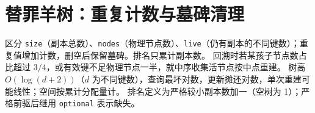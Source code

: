 \section{替罪羊树：重复计数与墓碑清理}\label{knowledge-scapegoat}
区分 \texttt{size}（副本总数）、\texttt{nodes}（物理节点数）、\texttt{live}（仍有副本的不同键数）；重复值增加计数，删空后保留墓碑。排名只累计副本数。
回溯时若某孩子节点数占比超过 $3/4$，或有效键不足物理节点一半，就中序收集活节点按中点重建。
树高 $O(\log(d+2))$（$d$ 为不同键数），查询最坏对数，更新摊还对数，单次重建可能线性；空间按累计分配量计。
排名定义为严格较小副本数加一（空树为 1）；严格前驱后继用 \texttt{optional} 表示缺失。
